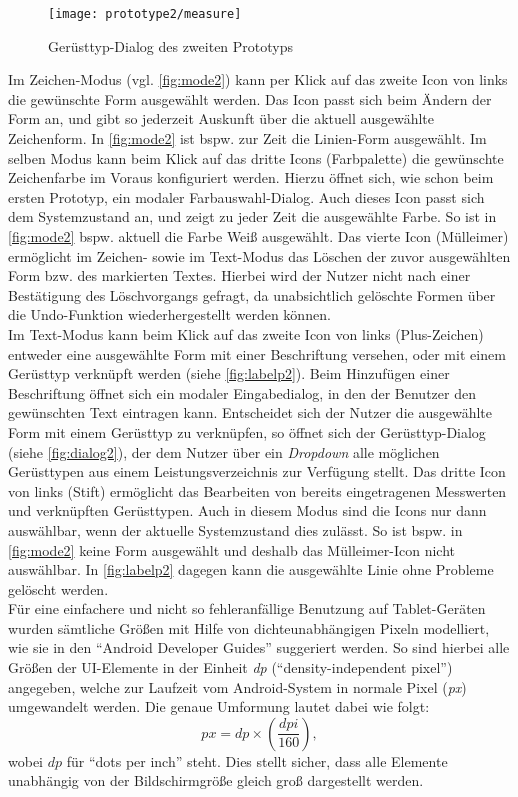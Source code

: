 \begin{wrapfigure}{R}{0.4\textwidth}
  \centering
  \texttt{[image: prototype2/measure]}
  \caption{Gerüsttyp-Dialog des zweiten Prototyps}
  \label{fig:dialog2}
\end{wrapfigure}

Im Zeichen-Modus (vgl. \autoref{fig:mode2}) kann per Klick auf das zweite Icon von links die gewünschte Form ausgewählt werden. 
Das Icon passt sich beim Ändern der Form an, und gibt so jederzeit Auskunft über die aktuell ausgewählte Zeichenform.
In \autoref{fig:mode2} ist bspw. zur Zeit die Linien-Form ausgewählt.
Im selben Modus kann beim Klick auf das dritte Icons (Farbpalette) die gewünschte Zeichenfarbe im Voraus konfiguriert werden. 
Hierzu öffnet sich, wie schon beim ersten Prototyp, ein modaler Farbauswahl-Dialog.
Auch dieses Icon passt sich dem Systemzustand an, und zeigt zu jeder Zeit die ausgewählte Farbe.
So ist in \autoref{fig:mode2} bspw. aktuell die Farbe Weiß ausgewählt.
Das vierte Icon (Mülleimer) ermöglicht im Zeichen- sowie im Text-Modus das Löschen der zuvor ausgewählten Form bzw. des markierten Textes. 
Hierbei wird der Nutzer nicht nach einer Bestätigung des Löschvorgangs gefragt, da unabsichtlich gelöschte Formen über die Undo-Funktion wiederhergestellt werden können. \\

Im Text-Modus kann beim Klick auf das zweite Icon von links (Plus-Zeichen) entweder eine ausgewählte Form mit einer Beschriftung versehen, oder mit einem Gerüsttyp verknüpft werden (siehe \autoref{fig:labelp2}).
Beim Hinzufügen einer Beschriftung öffnet sich ein modaler Eingabedialog, in den der Benutzer den gewünschten Text eintragen kann.
Entscheidet sich der Nutzer die ausgewählte Form mit einem Gerüsttyp zu verknüpfen, so öffnet sich der Gerüsttyp-Dialog (siehe \autoref{fig:dialog2}), der dem Nutzer über ein \emph{Dropdown} alle möglichen Gerüsttypen aus einem Leistungsverzeichnis zur Verfügung stellt.
Das dritte Icon von links (Stift) ermöglicht das Bearbeiten von bereits eingetragenen Messwerten und verknüpften Gerüsttypen.
Auch in diesem Modus sind die Icons nur dann auswählbar, wenn der aktuelle Systemzustand dies zulässt. 
So ist bspw. in \autoref{fig:mode2} keine Form ausgewählt und deshalb das Mülleimer-Icon nicht auswählbar. 
In \autoref{fig:labelp2} dagegen kann die ausgewählte Linie ohne Probleme gelöscht werden. \\

Für eine einfachere und nicht so fehleranfällige Benutzung auf Tablet-Geräten wurden sämtliche Größen mit Hilfe von dichteunabhängigen Pixeln modelliert, wie sie in den ``Android Developer Guides'' suggeriert werden.
So sind hierbei alle Größen der UI-Elemente in der Einheit \emph{dp} (``density-independent pixel'') angegeben, welche zur Laufzeit vom Android-System in normale Pixel (\emph{px}) umgewandelt werden.
Die genaue Umformung lautet dabei wie folgt:
\[
  px =  dp \times (\frac{dpi}{160}),
\]
wobei $dp$ für ``dots per inch'' steht.
Dies stellt sicher, dass alle Elemente unabhängig von der Bildschirmgröße gleich groß dargestellt werden. \\

